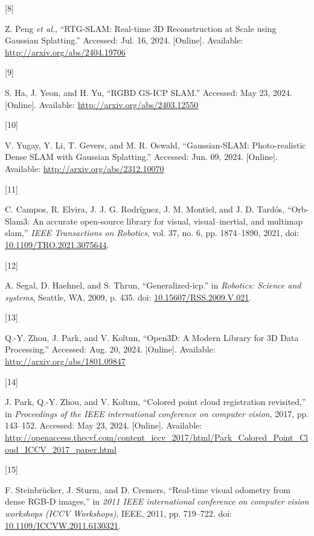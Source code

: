 \documentclass[twocolumn]{article} %
\newlength{\cslhangindent}
\newlength{\csllabelwidth}
\newenvironment{CSLReferences}[2] %
{\begin{list}{}{%
  \setlength{\itemindent}{0pt}
  \setlength{\leftmargin}{0pt}
  \setlength{\parsep}{0pt}
  \ifodd #1
  \setlength{\leftmargin}{\cslhangindent}
  \setlength{\itemindent}{-1\cslhangindent}
  \fi
  \setlength{\itemsep}{#2\baselineskip}}}
{\end{list}}
\newcommand{\CSLLeftMargin}[1]{\parbox[t]{\csllabelwidth}{\strut#1\strut}}
\newcommand{\CSLRightInline}[1]{\parbox[t]{\linewidth - \csllabelwidth}{\strut#1\strut}}
\begin{document}
\begin{CSLReferences}{0}{0}
\CSLLeftMargin{{[}8{]} }%
\CSLRightInline{Z. Peng \emph{et al.}, {``{RTG-SLAM}: {Real-time 3D
Reconstruction} at {Scale} using {Gaussian Splatting}.''} Accessed: Jul.
16, 2024. {[}Online{]}. Available:
\url{http://arxiv.org/abs/2404.19706}}

\CSLLeftMargin{{[}9{]} }%
\CSLRightInline{S. Ha, J. Yeon, and H. Yu, {``{RGBD GS-ICP SLAM}.''}
Accessed: May 23, 2024. {[}Online{]}. Available:
\url{http://arxiv.org/abs/2403.12550}}

\CSLLeftMargin{{[}10{]} }%
\CSLRightInline{V. Yugay, Y. Li, T. Gevers, and M. R. Oswald,
{``Gaussian-{SLAM}: {Photo-realistic Dense SLAM} with {Gaussian
Splatting}.''} Accessed: Jun. 09, 2024. {[}Online{]}. Available:
\url{http://arxiv.org/abs/2312.10070}}

\CSLLeftMargin{{[}11{]} }%
\CSLRightInline{C. Campos, R. Elvira, J. J. G. Rodríguez, J. M. Montiel,
and J. D. Tardós, {``Orb-Slam3: {An} accurate open-source library for
visual, visual--inertial, and multimap slam,''} \emph{IEEE Transactions
on Robotics}, vol. 37, no. 6, pp. 1874--1890, 2021, doi:
\href{https://doi.org/10.1109/TRO.2021.3075644}{10.1109/TRO.2021.3075644}.}

\CSLLeftMargin{{[}12{]} }%
\CSLRightInline{A. Segal, D. Haehnel, and S. Thrun,
{``Generalized-icp.''} in \emph{Robotics: Science and systems}, Seattle,
WA, 2009, p. 435. doi:
\href{https://doi.org/10.15607/RSS.2009.V.021}{10.15607/RSS.2009.V.021}.}

\CSLLeftMargin{{[}13{]} }%
\CSLRightInline{Q.-Y. Zhou, J. Park, and V. Koltun, {``{Open3D}: {A
Modern Library} for {3D Data Processing}.''} Accessed: Aug. 20, 2024.
{[}Online{]}. Available: \url{http://arxiv.org/abs/1801.09847}}

\CSLLeftMargin{{[}14{]} }%
\CSLRightInline{J. Park, Q.-Y. Zhou, and V. Koltun, {``Colored point
cloud registration revisited,''} in \emph{Proceedings of the {IEEE}
international conference on computer vision}, 2017, pp. 143--152.
Accessed: May 23, 2024. {[}Online{]}. Available:
\url{http://openaccess.thecvf.com/content_iccv_2017/html/Park_Colored_Point_Cloud_ICCV_2017_paper.html}}

\CSLLeftMargin{{[}15{]} }%
\CSLRightInline{F. Steinbrücker, J. Sturm, and D. Cremers, {``Real-time
visual odometry from dense {RGB-D} images,''} in \emph{2011 {IEEE}
international conference on computer vision workshops ({ICCV
Workshops})}, IEEE, 2011, pp. 719--722. doi:
\href{https://doi.org/10.1109/ICCVW.2011.6130321}{10.1109/ICCVW.2011.6130321}.}

\end{CSLReferences}
\end{document}
